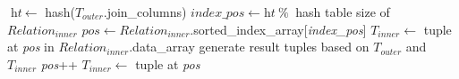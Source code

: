 \documentclass[nonacm,sigplan]{acmart}
\newcommand{\tool}{\textsc{GPUlog}}
\newcommand{\shovon}[1]{{\textcolor{green}{\{\textbf{Shovon}: #1\}}}}
\begin{document}





\begin{algorithm}[t]
\caption{Parallel Binary Join on GPU}
\label{alg:join}
\begin{algorithmic}[1]
    \State $\textit{ht} ~ \gets$ hash($T_{outer}$.join\_columns)
    \State $\textit{index\_pos} \gets \textit{ht} ~ \% ~$ hash table size of $ \textit{Relation}_{inner}$
    \State $\textit{pos} \gets \textit{Relation}_{inner}$.sorted\_index\_array[\textit{index\_pos}]
    \State $T_{inner} \gets$ tuple at \textit{pos} in $\textit{Relation}_{inner}$.data\_array
        \State generate result tuples based on $T_{outer}$ and $T_{inner}$
        \State \textit{pos}++
        \State $T_{inner} \gets$ tuple at \textit{pos}
    \EndWhile
\EndFor
\end{algorithmic}
\end{algorithm}
\end{document}
